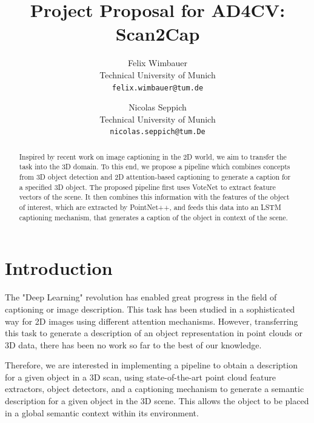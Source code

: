 \documentclass[10pt,twocolumn,letterpaper]{article}
\begin{document}
\title{Project Proposal for AD4CV: Scan2Cap}

\author{Felix Wimbauer\\
Technical University of Munich\\
{\tt\small felix.wimbauer@tum.de}
\and
Nicolas Seppich\\
Technical University of Munich\\
{\tt\small nicolas.seppich@tum.De}
}

\maketitle

\begin{abstract}
	Inspired by recent work on image captioning in the 2D world, we aim to transfer the task into the 3D domain. To this end, we propose a pipeline which combines concepts from 3D object detection and 2D attention-based captioning to generate a caption for a specified 3D object. The proposed pipeline first uses VoteNet to extract feature vectors of the scene. It then combines this information with the features of the object of interest, which are extracted by PointNet++, and feeds this data into an LSTM captioning mechanism, that generates a caption of the object in context of the scene.  
   
\end{abstract}

\section{Introduction}

The "Deep Learning" revolution has enabled great progress in the field of captioning or image description. This task has been studied in a sophisticated way for 2D images using different attention mechanisms.
However, transferring this task to generate a description of an object representation in point clouds or 3D data, there has been no work so far to the best of our knowledge.

Therefore, we are interested in implementing a pipeline to obtain a description for a given object in a 3D scan, using state-of-the-art point cloud feature extractors, object detectors, and a captioning mechanism to generate a semantic description for a given object in the 3D scene. This allows the object to be placed in a global semantic context within its environment.
 
\end{document}
